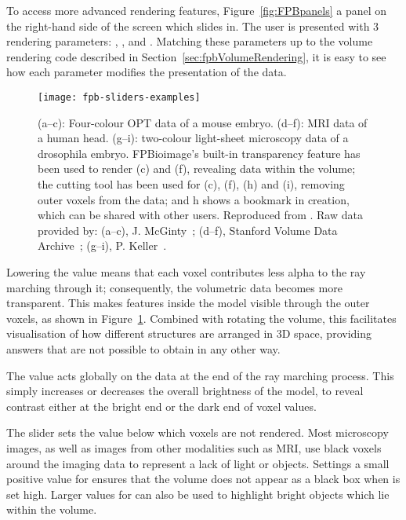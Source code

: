 To access more advanced rendering features, Figure~\ref{fig:FPBpanels} a panel on the right-hand side of the screen which slides in.
The user is presented with 3 rendering parameters: , , and .
Matching these parameters up to the volume rendering code described in Section~\ref{sec:fpbVolumeRendering}, it is easy to see how each parameter modifies the presentation of the data.

\begin{figure}[htbp!]
\centering
\texttt{[image: fpb-sliders-examples]}
\caption[FPBioimage: Advanced rendering features provide unique views of volumetric data]{(a–c): Four-colour OPT data of a mouse embryo. (d–f): MRI data of a human head. (g–i): two-colour light-sheet microscopy data of a drosophila embryo. FPBioimage's built-in transparency feature has been used to render (c) and (f), revealing data within the volume; the cutting tool has been used for (c), (f), (h) and (i), removing outer voxels from the data; and h shows a bookmark in creation, which can be shared with other users. Reproduced from \cite{fantham2017new}. Raw data provided by: (a–c), J. McGinty~\cite{sharpe2002optical}; (d–f), Stanford Volume Data Archive~\cite{levoy1988volume}; (g–i), P. Keller~\cite{chhetri2015whole}. }
\label{fig:fpbRendering}
\end{figure}

Lowering the  value means that each voxel contributes less alpha to the ray marching through it; consequently, the volumetric data becomes more transparent.
This makes features inside the model visible through the outer voxels, as shown in Figure~\ref{fig:fpbRendering}.
Combined with rotating the volume, this facilitates visualisation of how different structures are arranged in 3D space, providing answers that are not possible to obtain in any other way.

The  value acts globally on the data at the end of the ray marching process.
This simply increases or decreases the overall brightness of the model, to reveal contrast either at the bright end or the dark end of voxel values. %

The  slider sets the value below which voxels are not rendered.
Most microscopy images, as well as images from other modalities such as MRI, use black voxels around the imaging data to represent a lack of light or objects.
Settings a small positive value for  ensures that the volume does not appear as a black box when  is set high.
Larger values for  can also be used to highlight bright objects which lie within the volume.

